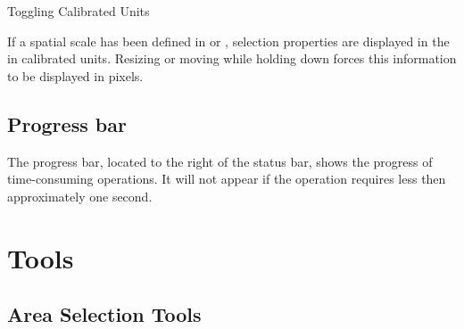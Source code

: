 
\noindent {\small }
\begin{infobox}
\caption{\label{infobox:Toggle-Cal-Units}Toggling Calibrated Units}


\noindent If a spatial scale has been defined in 
or ,
selection properties are displayed in the 
in calibrated units. Resizing or moving while holding down 
forces this information to be displayed in pixels.
\end{infobox}
{\small \par}


\subsection*{\noindent Progress bar\label{sub:Progress-bar}}

The progress bar, located to the right of the
status bar, shows the progress of time-consuming operations. It will
not appear if the operation requires less then approximately one second.



\section{Tools\label{sec:IJ-Tools}}


\renewenvironment{lyxlist}[1]{%
  \begin{list}{}{%
    \settowidth{\labelwidth}{#1}
    \addtolength{\labelwidth}{3.5ex}
    \addtolength{\topsep}{-1.2ex}
    \setlength{\leftmargin}{\labelwidth}
    \addtolength{\leftmargin}{\labelsep}
    \renewcommand{\makelabel}[1]{\qquad{}##1\hfil}
  }%
}{\end{list}}



\subsection{Area Selection Tools\label{sec:Area-selection-tools}}

